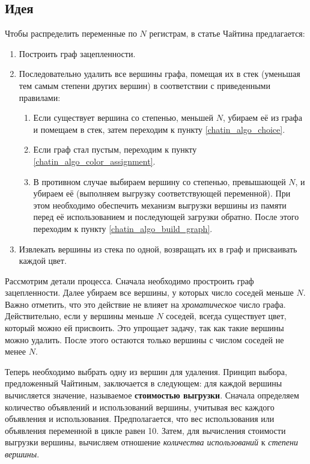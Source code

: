 \subsection{Идея}

Чтобы распределить переменные по $N$ регистрам, в статье Чайтина предлагается:

\begin{enumerate}
    \item Построить граф зацепленности. \label{chatin_algo_build_graph}
    \item Последовательно удалить все вершины графа, помещая их в стек (уменьшая тем самым степени других вершин) в соответствии с приведенными правилами: \label{chatin_algo_choice}
    \begin{enumerate}
        \item Если существует вершина со степенью, меньшей $N$, убираем её из графа и помещаем в стек, затем переходим к пункту \ref{chatin_algo_choice}.
        \item Если граф стал пустым, переходим к пункту \ref{chatin_algo_color_assignment}.
        \item В противном случае выбираем вершину со степенью, превышающей $N$, и убираем её (выполняем выгрузку соответствующей переменной). 
        При этом необходимо обеспечить механизм выгрузки вершины из памяти перед её использованием и последующей загрузки обратно. 
        После этого переходим к пункту \ref{chatin_algo_build_graph}. \label{chatin_algo_spill}
    \end{enumerate}
    \item Извлекать вершины из стека по одной, возвращать их в граф и присваивать каждой цвет. \label{chatin_algo_color_assignment}
\end{enumerate}

Рассмотрим детали процесса.
Сначала необходимо простроить граф зацепленности.
Далее убираем все вершины, у которых число соседей меньше $N$. 
Важно отметить, что это действие не влияет на \textit{хроматическое} число графа. 
Действительно, если у вершины меньше $N$ соседей, всегда существует цвет, который можно ей присвоить. 
Это упрощает задачу, так как такие вершины можно удалить. 
После этого остаются только вершины с числом соседей не менее $N$.

Теперь необходимо выбрать одну из вершин для удаления.
Принцип выбора, предложенный Чайтиным, заключается в следующем: для каждой вершины вычисляется значение, называемое \textbf{стоимостью выгрузки}. 
Сначала определяем количество объявлений и использований вершины, учитывая вес каждого объявления и использования. 
Предполагается, что вес использования или объявления переменной в цикле равен 10. 
Затем, для вычисления стоимости выгрузки вершины, вычисляем отношение 
\textit{количества использований} к \textit{степени вершины}.

